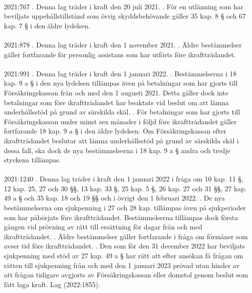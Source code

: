 \documentclass[a4paper,notitlepage,openany,10pt]{book}
\begin{document}
\paragraph*{}
2021:767
. Denna lag träder i kraft den 20 juli 2021.
. För en utlänning som har beviljats uppehållstillstånd som övrig skyddsbehövande gäller 35 kap. 8 § och 67 kap. 7 § i den äldre lydelsen.
\paragraph*{}
2021:878
. Denna lag träder i kraft den 1 november 2021.
. Äldre bestämmelser gäller fortfarande för personlig assistans som har utförts före ikraftträdandet.
\paragraph*{}
2021:991
. Denna lag träder i kraft den 1 januari 2022.
. Bestämmelserna i 18 kap. 9 a § i den nya lydelsen tillämpas även på betalningar som har gjorts till Försäkringskassan från och med den 1 augusti 2021. Detta gäller dock inte betalningar som före ikraftträdandet har beaktats vid beslut om att lämna underhållsstöd på grund av särskilda skäl.
. För betalningar som har gjorts till Försäkringskassan under minst sex månader i följd före ikraftträdandet gäller fortfarande 18 kap. 9 a § i den äldre lydelsen. Om Försäkringskassan efter ikraftträdandet beslutar att lämna underhållsstöd på grund av särskilda skäl i dessa fall, ska dock de nya bestämmelserna i 18 kap. 9 a § andra och tredje styckena tillämpas.
\paragraph*{}
2021:1240
. Denna lag träder i kraft den 1 januari 2022 i fråga om 10 kap. 11 §, 12 kap. 25, 27 och 30 §§, 13 kap. 33 §, 25 kap. 5 §, 26 kap. 27 och 31 §§, 27 kap. 49 a § och 35 kap. 18 och 19 §§ och i övrigt den 1 februari 2022.
. De nya bestämmelserna om sjukpenning i 27 och 28 kap. tillämpas även på sjukperioder som har påbörjats före ikraftträdandet. Bestämmelserna tillämpas dock första gången vid prövning av rätt till ersättning för dagar från och med ikraftträdandet.
. Äldre bestämmelser gäller fortfarande i fråga om förmåner som avser tid före ikraftträdandet.
. Den som för den 31 december 2022 har beviljats sjukpenning med stöd av 27 kap. 49 a § har rätt att efter ansökan få frågan om rätten till sjukpenning från och med den 1 januari 2023 prövad utan hinder av att frågan tidigare avgjorts av Försäkringskassan eller domstol genom beslut som fått laga kraft.
Lag (2022:1855).
\end{document}
